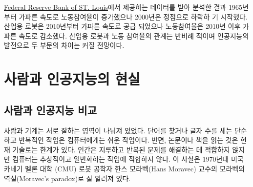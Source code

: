 \documentclass[smallextended]{svjour3}       %
\begin{document}
\href{https://research.stlouisfed.org/docs/api/api_key.html}{Federal
Reserve Bank of ST. Louis}에서 제공하는 데이터를 받아 분석한 결과
1965년부터 가파른 속도로 노동참여율이 증가했으나 2000년은 정점으로
하락하 기 시작했다. 산업용 로봇은 2010년부터 가파른 속도로 공급 되었으나
노동참여율은 2010년 이후 가파른 속도로 감소했다. 산업용 로봇과 노동
참여율의 관계는 반비례 적이며 인공지능의 발전으로 두 부문의 차이는 커질
전망이다.

\hypertarget{human-and-ai-reality}{%
\section{사람과 인공지능의 현실}\label{human-and-ai-reality}}

\hypertarget{human-and-ai-compare}{%
\subsection{사람과 인공지능 비교}\label{human-and-ai-compare}}

\begin{table}[H]
\centering
{}
\end{table}

사람과 기계는 서로 잘하는 영역이 나눠져 있었다. 단어를 찾거나 글자 수를
세는 단순하고 반복적인 작업은 컴퓨터에게는 쉬운 작업이다. 반면, 논문이나
책을 읽는 것은 현재 기술로는 한계가 있다. 인간은 지루하고 반복된 문제를
해결하는 데 적합하지 않지만 컴퓨터는 추상적이고 일반화하는 작업에
적합하지 않다. 이 사실은 1970년대 미국 카네기 멜론 대학 (CMU) 로봇
공학자 한스 모라벡(Hans Moravec) 교수의 모라벡의 역설(Moravec's
paradox)로 잘 알려져 있다.
\end{document}
